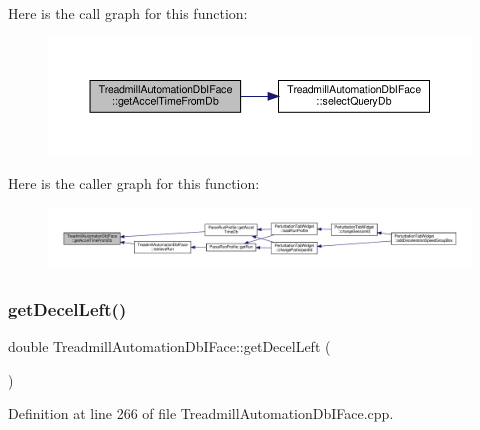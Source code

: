 Here is the call graph for this function\+:
\nopagebreak
\begin{figure}[H]
\begin{center}
\leavevmode
\includegraphics[width=350pt]{class_treadmill_automation_db_i_face_a0872715321e189d3a3fbf1084e3d5274_cgraph}
\end{center}
\end{figure}
Here is the caller graph for this function\+:
\nopagebreak
\begin{figure}[H]
\begin{center}
\leavevmode
\includegraphics[width=350pt]{class_treadmill_automation_db_i_face_a0872715321e189d3a3fbf1084e3d5274_icgraph}
\end{center}
\end{figure}
\mbox{\label{class_treadmill_automation_db_i_face_a8cd4911ddb9fadc6a5b9c5ad4512851e}} 
\subsubsection{\texorpdfstring{get\+Decel\+Left()}{getDecelLeft()}}
{\footnotesize\ttfamily double Treadmill\+Automation\+Db\+I\+Face\+::get\+Decel\+Left (\begin{DoxyParamCaption}{ }\end{DoxyParamCaption})}



Definition at line 266 of file Treadmill\+Automation\+Db\+I\+Face.\+cpp.

